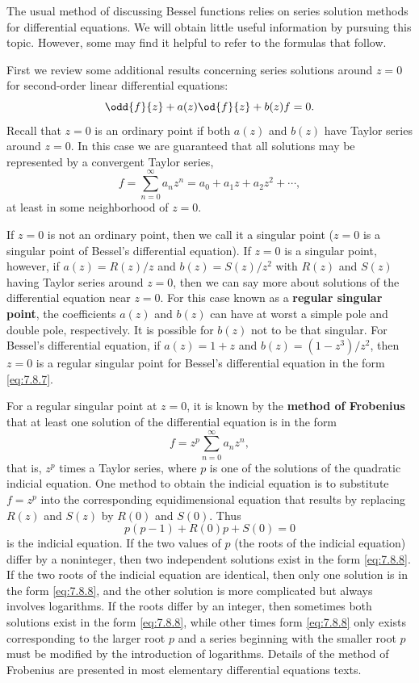 The usual method of discussing Bessel functions relies on series solution methods for differential equations.  We will obtain little useful information by pursuing this topic.  However, some may find it helpful to refer to the formulas that follow.

First we review some additional results concerning series solutions around $z = 0$ for second-order linear differential equations:
\begin{equation}
\odd{f}{z} + a(z)\od{f}{z} + b(z)f = 0.
\label{eq:7.8.7}
\end{equation}
Recall that $z = 0$ is an ordinary point if both $a(z)$ and $b(z)$ have Taylor series around $z = 0$.  In this case we are guaranteed that all solutions may be represented by a convergent Taylor series,
\[
f = \sum_{n=0}^{\infty} a_n z^n = a_0 + a_1 z + a_2 z^2 + \cdots,
\]
at least in some neighborhood of $z = 0$.

If $z = 0$ is not an ordinary point, then we call it a singular point ($z = 0$ is a singular point of Bessel's differential equation).  If $z = 0$ is a singular point, however, if $a(z) = R(z)/z$ and $b(z) = S(z)/z^2$ with $R(z)$ and $S(z)$ having Taylor series around $z = 0$, then we can say more about solutions of the differential equation near $z = 0$.  For this case known as a \textbf{regular singular point}, the coefficients $a(z)$ and $b(z)$ can have at worst a simple pole and double pole, respectively.  It is possible for $b(z)$ not to be that singular.  For Bessel's differential equation, if $a(z) = 1 + z$ and $b(z) = (1 - z^3)/z^2$, then $z = 0$ is a regular singular point for Bessel's differential equation in the form \eqref{eq:7.8.7}.

For a regular singular point at $z = 0$, it is known by the \textbf{method of Frobenius} that at least one solution of the differential equation is in the form
\begin{equation}
f = z^p\sum_{n=0}^{\infty} a_n z^n,
\label{eq:7.8.8}
\end{equation}
that is, $z^p$ times a Taylor series, where $p$ is one of the solutions of the quadratic indicial equation.  One method to obtain the indicial equation is to substitute $f = z^p$ into the corresponding equidimensional equation that results by replacing $R(z)$ and $S(z)$ by $R(0)$ and $S(0)$.  Thus
\[
p(p-1) + R(0)p + S(0) = 0
\]
is the indicial equation.  If the two values of $p$ (the roots of the indicial equation) differ by a noninteger, then two independent solutions exist in the form \eqref{eq:7.8.8}.  If the two roots of the indicial equation are identical, then only one solution is in the form \eqref{eq:7.8.8}, and the other solution is more complicated but always involves logarithms.  If the roots differ by an integer, then sometimes both solutions exist in the form \eqref{eq:7.8.8}, while other times form \eqref{eq:7.8.8} only exists corresponding to the larger root $p$ and a series beginning with the smaller root $p$ must be modified by the introduction of logarithms.  Details of the method of Frobenius are presented in most elementary differential equations texts.

